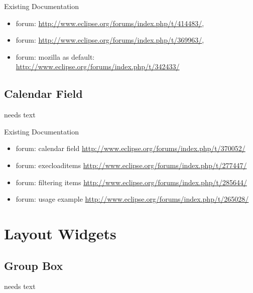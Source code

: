 \documentclass[a4paper,10pt,twoside]{book}
\begin{document}
{\noindent Existing Documentation
\begin{itemize}
  \item forum: \url{http://www.eclipse.org/forums/index.php/t/414483/}, 
  \item forum: \url{http://www.eclipse.org/forums/index.php/t/369963/}, 
  \item forum: mozilla as default: \url{http://www.eclipse.org/forums/index.php/t/342433/}
\end{itemize}

\section{Calendar Field}
needs text

\noindent Existing Documentation
\begin{itemize}
  \item forum: calendar field \url{http://www.eclipse.org/forums/index.php/t/370052/}
  \item forum: execloaditems \url{http://www.eclipse.org/forums/index.php/t/277447/}
  \item forum: filtering items \url{http://www.eclipse.org/forums/index.php/t/285644/}
  \item forum: usage example \url{http://www.eclipse.org/forums/index.php/t/265028/}
\end{itemize}

\chapter{Layout Widgets}

\section{Group Box}
needs text


}
\end{document}
